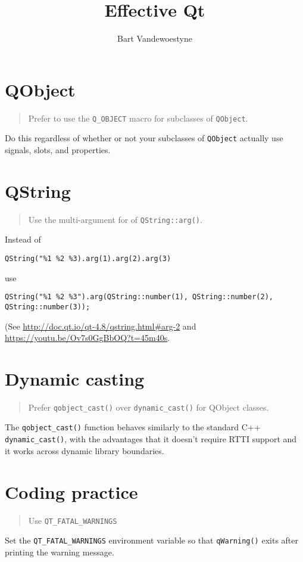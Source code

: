 \documentclass{book}
\title{Effective Qt}
\author{Bart Vandewoestyne}
\newcommand{\code}[1]{\texttt{#1}}
\newenvironment{guideline}
{ \begin{quote} }
{ \end{quote} }
\begin{document}
\maketitle

\tableofcontents

\section{QObject}

\begin{guideline}
Prefer to use the \code{Q\_OBJECT} macro for subclasses of \code{QObject}.
\end{guideline}
Do this regardless of whether or not your subclasses of \code{QObject} actually use signals, slots, and properties.

\section{QString}

\begin{guideline}
Use the multi-argument for of \code{QString::arg()}.
\end{guideline}
Instead of
\begin{verbatim}
QString("%1 %2 %3).arg(1).arg(2).arg(3)
\end{verbatim}
use
\begin{verbatim}
QString("%1 %2 %3").arg(QString::number(1), QString::number(2), QString::number(3));
\end{verbatim}
(See \url{http://doc.qt.io/qt-4.8/qstring.html#arg-2} and \url{https://youtu.be/Ov7s0GgBbOQ?t=45m40s}.

\section{Dynamic casting}

\begin{guideline}
Prefer \code{qobject\_cast()} over \code{dynamic\_cast()} for QObject classes.
\end{guideline}
The \code{qobject\_cast()} function behaves similarly to the standard C++ \code{dynamic\_cast()}, with the advantages that it doesn't require RTTI support and it works across dynamic library boundaries.

\section{Coding practice}

\begin{guideline}
Use \code{QT\_FATAL\_WARNINGS}
\end{guideline}
Set the \code{QT\_FATAL\_WARNINGS} environment variable so that \code{qWarning()} exits after printing the warning message.
\end{document}
